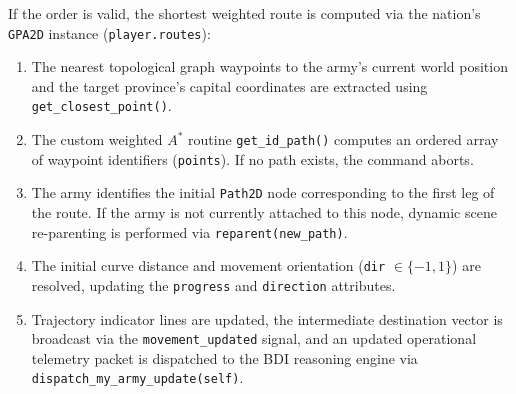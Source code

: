 If the order is valid, the shortest weighted route is computed via the nation's \texttt{GPA2D} instance (\texttt{player.routes}):
\begin{enumerate}
    \item The nearest topological graph waypoints to the army's current world position and the target province's capital coordinates are extracted using \texttt{get\_closest\_point()}.
    \item The custom weighted $A^*$ routine \texttt{get\_id\_path()} computes an ordered array of waypoint identifiers (\texttt{points}). If no path exists, the command aborts.
    \item The army identifies the initial \texttt{Path2D} node corresponding to the first leg of the route. If the army is not currently attached to this node, dynamic scene re-parenting is performed via \texttt{reparent(new\_path)}.
    \item The initial curve distance and movement orientation (\texttt{dir} $\in \{-1, 1\}$) are resolved, updating the \texttt{progress} and \texttt{direction} attributes.
    \item Trajectory indicator lines are updated, the intermediate destination vector is broadcast via the \texttt{movement\_updated} signal, and an updated operational telemetry packet is dispatched to the BDI reasoning engine via \texttt{dispatch\_my\_army\_update(self)}.
\end{enumerate}

